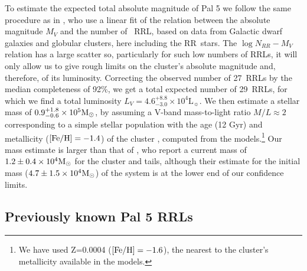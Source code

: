 \documentclass[twocolumn]{aastex63}
\newcommand{\sa}[1]{{\color{teal} SP: #1}}
\begin{document}
To estimate the expected total absolute magnitude of Pal 5 we follow the same procedure as in \citet{Mateu:2018}, who use a linear fit of the relation between the absolute magnitude $M_V$ and the number of \typeab\ RRL, based on data from Galactic dwarf galaxies and globular clusters, here including the RR\typec~stars.
The $\log{N_{RR}}-M_V$ relation has a large scatter so, particularly for such low numbers of RRLs, it will only allow us to give rough limits on the cluster's absolute magnitude and, therefore, of its luminosity. Correcting the observed number of 27~RRLs by the median completeness of 92\%, we get a total expected number of 29~RRLs, for which we find a total luminosity $L_V=4.6_{-3.0}^{+8.8}\times 10^4 \mathrm{L}_\sun$.
We then estimate a stellar mass of $0.9_{-0.6}^{+1.8}\times 10^5 \mathrm{M}_\odot$, by assuming a V-band mass-to-light ratio $M/L \approx 2$ \citep{Baumgardt:2019} corresponding to a simple stellar population with the age (12 Gyr) and metallicity ($[\mathrm{Fe}/\mathrm{H}]=-1.4$) of the cluster \citep{Dotter:2011}, computed from the \citet{Bruzual:2003} models.\footnote{We have used Z=0.0004 ($[\mathrm{Fe}/\mathrm{H}]=-1.6$), the nearest to the cluster's metallicity available in the models.}
Our mass estimate is larger than that of \citet{Ibata:2017}, who report a current mass of $1.2\pm 0.4 \times10^4\mathrm{M}_\odot$ for the cluster and tails, although their estimate for the initial mass ($4.7\pm 1.5\times10^4\mathrm{M}_\odot$) of the system is at the lower end of our confidence limits.






\subsection{Previously known Pal 5 RRLs}
\end{document}
